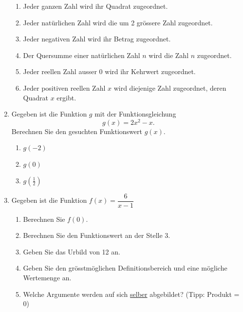 \begin{enumerate}
\begin{enumerate}
              \item Jeder ganzen Zahl wird ihr Quadrat zugeordnet.
              \item Jeder natürlichen Zahl wird die um 2 grössere Zahl zugeordnet.
              \item Jeder negativen Zahl wird ihr Betrag zugeordnet.
              \item Der Quersumme einer natürlichen Zahl $n$ wird die Zahl $n$ zugeordnet.
              \item Jeder reellen Zahl ausser $0$ wird ihr Kehrwert zugeordnet.
              \item Jeder positiven reellen Zahl $x$ wird diejenige Zahl zugeordnet, deren Quadrat $x$ ergibt.
          \end{enumerate}
    \item Gegeben ist die Funktion \( g \) mit der Funktionsgleichung
          \[
              g(x) = 2x^2 - x.
          \]
          Berechnen Sie den gesuchten Funktionswert \( g(x) \).
          \begin{multicols}{4}
              \begin{enumerate}
                  \item \( g(-2) \)
                  \item \( g(0) \)
                  \item \( g\left(\tfrac{1}{2}\right) \)
              \end{enumerate}
          \end{multicols}
    \item Gegeben ist die Funktion \( f(x) = \dfrac{6}{x - 1} \)
          \begin{enumerate}[label=\alph*)]
              \item Berechnen Sie \( f(0) \).
              \item Berechnen Sie den Funktionswert an der Stelle 3.
              \item Geben Sie das Urbild von 12 an.
              \item Geben Sie den grösstmöglichen Definitionsbereich und eine mögliche Wertemenge an.
              \item Welche Argumente werden auf sich \underline{selber} abgebildet? (Tipp: Produkt = 0)
          \end{enumerate}


\end{enumerate}
